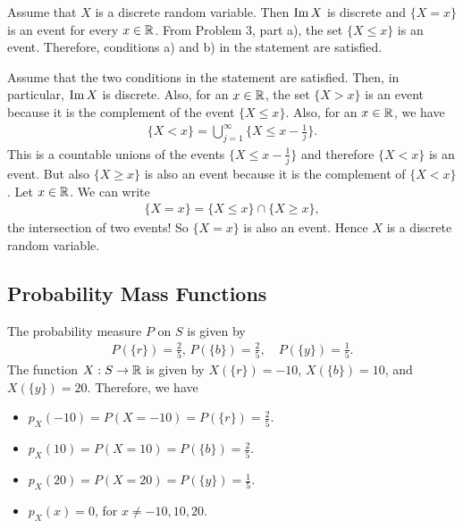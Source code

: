     \begin{problem}
    Assume that $X$ is a discrete random variable. Then $\operatorname{Im} X$ is discrete and $\{ X = x \}$ is an event for every $x \in \mathbb{R}$. From Problem 3, part a), the set $\{ X \leq x \}$ is an event. Therefore, conditions a) and b) in the statement are satisfied.

    Assume that the two conditions in the statement are satisfied. Then, in particular, $\operatorname{Im} X$ is discrete. Also, for an $x \in \mathbb{R}$, the set $\{ X > x \}$ is an event because it is the complement of the event $\{ X \leq x \}$. Also, for an $x \in \mathbb{R}$, we have
        \begin{align*}
        \{ X < x \} = \bigcup_{j = 1}^\infty \Big\{ X \leq x - \frac{1}{j} \Big\} .
        \end{align*} 
    This is a countable unions of the events $\{ X \leq x - \frac{1}{j} \}$ and therefore $\{ X < x \}$ is an event. But also $\{ X \geq x \}$ is also an event because it is the complement of $\{ X < x \}$. Let $x \in \mathbb{R}$. We can write
        \begin{align*}
        \{X = x \} = \{ X \leq x \} \cap \{ X \geq x \} ,
        \end{align*} 
    the intersection of two events! So $\{ X = x \}$ is also an event. Hence $X$ is a discrete random variable.
    \end{problem}

\subsection{Probability Mass Functions}

    \begin{problem}
    The probability measure $P$ on $S$ is given by
    \begin{align*}
    P (\{ r \}) = \frac{2}{5} , \, P (\{ b \}) = \frac{2}{5} , \quad P (\{ y \}) = \frac{1}{5} .
    \end{align*} 
    The function $X : S \rightarrow \mathbb{R}$ is given by $X (\{ r \}) = -10$, $X (\{ b \}) = 10$, and $X (\{ y \}) = 20$. Therefore, we have
        \begin{itemize}
            \item $p_X (-10) = P (X = -10) = P (\{ r \}) = \frac{2}{5}$.
            \item $p_X (10) = P (X = 10) = P (\{ b \}) = \frac{2}{5}$.
            \item $p_X (20) = P (X = 20) = P (\{ y \}) = \frac{1}{5}$.
            \item $p_X (x) = 0$, for $x \neq -10, 10, 20$.
        \end{itemize} 
    \end{problem}

